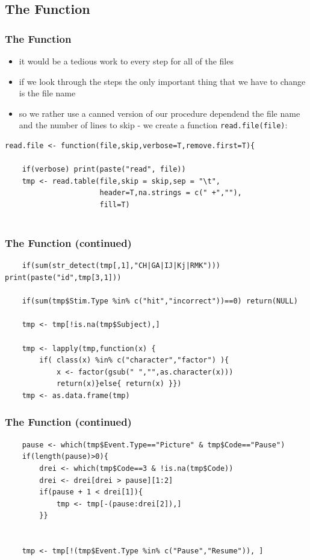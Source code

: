 \documentclass[xcolor={table},c]{beamer}
\begin{document}
\subsection{The Function}
\begin{frame}[fragile]\frametitle{The Function}
  \begin{itemize}
  \item it would be a tedious work to every step for all of the files
  \item if we look through the steps the only important thing that we have to change is the file name
  \item so we rather use a canned version of our procedure dependend the file name and the number of lines to skip  - we create a function \texttt{read.file(file)}:
  \end{itemize}
\begin{verbatim}
read.file <- function(file,skip,verbose=T,remove.first=T){

    if(verbose) print(paste("read", file))
    tmp <- read.table(file,skip = skip,sep = "\t",
                      header=T,na.strings = c(" +",""),
                      fill=T)


\end{verbatim}
\end{frame}

\begin{frame}[fragile]\frametitle{The Function (continued)}\scriptsize
\begin{verbatim}
    if(sum(str_detect(tmp[,1],"CH|GA|IJ|Kj|RMK"))) print(paste("id",tmp[3,1]))

    if(sum(tmp$Stim.Type %in% c("hit","incorrect"))==0) return(NULL)

    tmp <- tmp[!is.na(tmp$Subject),] 

    tmp <- lapply(tmp,function(x) {
        if( class(x) %in% c("character","factor") ){
            x <- factor(gsub(" ","",as.character(x)))
            return(x)}else{ return(x) }})
    tmp <- as.data.frame(tmp)
\end{verbatim}
\end{frame}


\begin{frame}[fragile]\frametitle{The Function (continued)}\scriptsize
\begin{verbatim}
    pause <- which(tmp$Event.Type=="Picture" & tmp$Code=="Pause")
    if(length(pause)>0){
        drei <- which(tmp$Code==3 & !is.na(tmp$Code))
        drei <- drei[drei > pause][1:2]
        if(pause + 1 < drei[1]){
            tmp <- tmp[-(pause:drei[2]),]
        }}

    
    tmp <- tmp[!(tmp$Event.Type %in% c("Pause","Resume")), ]

\end{verbatim}
\end{frame}
\end{document}
